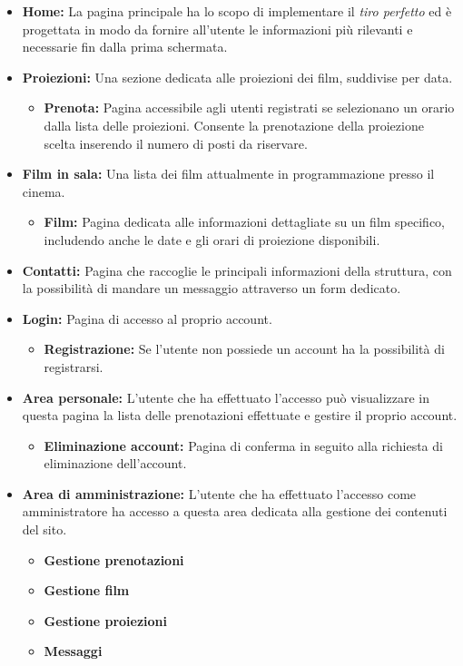 \begin{itemize}
    \item \textbf{Home:} La pagina principale ha lo scopo di implementare il \textit{tiro perfetto} ed è progettata in modo da fornire all'utente le informazioni più rilevanti e necessarie fin dalla prima schermata.
    \item \textbf{Proiezioni:} Una sezione dedicata alle proiezioni dei film, suddivise per data.
    \begin{itemize}
        \item \textbf{Prenota:} Pagina accessibile agli utenti registrati se selezionano un orario dalla lista delle proiezioni. Consente la prenotazione della proiezione scelta inserendo il numero di posti da riservare.
    \end{itemize}
    \item \textbf{Film in sala:} Una lista dei film attualmente in programmazione presso il cinema.
    \begin{itemize}    
        \item \textbf{Film:} Pagina dedicata alle informazioni dettagliate su un film specifico, includendo anche le date e gli orari di proiezione disponibili.
    \end{itemize}
    \item \textbf{Contatti:} Pagina che raccoglie le principali informazioni della struttura, con la possibilità di mandare un messaggio attraverso un form dedicato.
    \item \textbf{Login:} Pagina di accesso al proprio account.
    \begin{itemize}
        \item \textbf{Registrazione:} Se l'utente non possiede un account ha la possibilità di \\registrarsi.
    \end{itemize}
    \item \textbf{Area personale:} L'utente che ha effettuato l'accesso può visualizzare in questa pagina la lista delle prenotazioni effettuate e gestire il proprio account.
    \begin{itemize}
        \item \textbf{Eliminazione account:} Pagina di conferma in seguito alla richiesta di eliminazione dell'account.
    \end{itemize}
    \item \textbf{Area di amministrazione:} L'utente che ha effettuato l'accesso come amministratore ha accesso a questa area dedicata alla gestione dei contenuti del sito.
    \begin{itemize}
        \item \textbf{Gestione prenotazioni}
        \item \textbf{Gestione film}
        \item \textbf{Gestione proiezioni}
        \item \textbf{Messaggi}
    \end{itemize}
\end{itemize}

